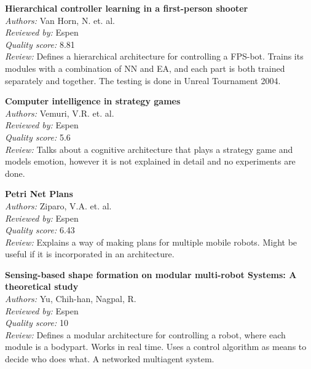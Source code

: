 {\textbf{Hierarchical controller learning in a first-person shooter\cite{van2009hierarchical}}\\
\textit{Authors:} Van Horn, N. et. al.\\
\textit{Reviewed by:} Espen\\
\textit{Quality score:} 8.81\\
\textit{Review:} Defines a hierarchical architecture for controlling a FPS-bot. Trains its modules with a combination of NN and EA, and each part is both trained separately and together. The testing is done in Unreal Tournament 2004. 

\textbf{Computer intelligence in strategy games\cite{vemuri2009computational}}\\
\textit{Authors:} Vemuri, V.R. et. al.\\
\textit{Reviewed by:} Espen\\
\textit{Quality score:} 5.6\\
\textit{Review:} Talks about a cognitive architecture that plays a strategy game and models emotion, however it is not explained in detail and no experiments are done.

\textbf{Petri Net Plans\cite{ziparo2006petri}}\\
\textit{Authors:} Ziparo, V.A. et. al.\\
\textit{Reviewed by:} Espen\\
\textit{Quality score:} 6.43\\
\textit{Review:} Explains a way of making plans for multiple mobile robots. Might be useful if it is incorporated in an architecture.

\textbf{Sensing-based shape formation on modular multi-robot Systems: A theoretical study\cite{yu2008sensing}}\\
\textit{Authors:} Yu, Chih-han, Nagpal, R.	\\
\textit{Reviewed by:} Espen\\
\textit{Quality score:} 10\\
\textit{Review:} Defines a modular architecture for controlling a robot, where each module is a bodypart. Works in real time. Uses a control algorithm as means to decide who does what. A networked multiagent system.

}
